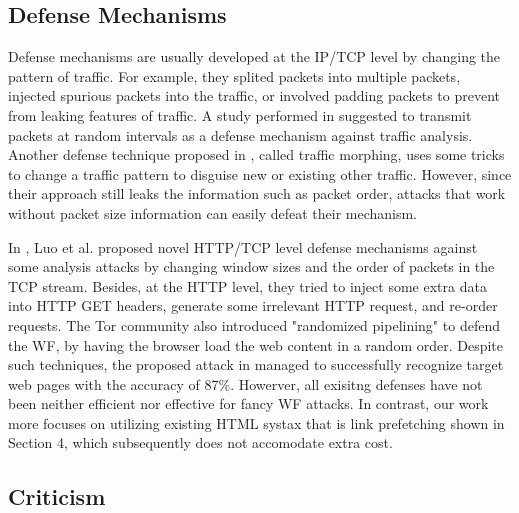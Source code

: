 

\subsection{Defense Mechanisms}

Defense mechanisms are usually developed at the IP/TCP level by changing the pattern of traffic.
For example, they splited packets into multiple packets, injected spurious packets into the traffic, or involved  padding packets to prevent from leaking features of traffic.
A study performed in \cite{fu2003} suggested to transmit packets at random intervals as a defense mechanism against traffic analysis.
Another defense technique proposed in \cite{wright2009}, called traffic morphing, uses some tricks to change a traffic pattern to disguise new or existing other traffic.
However, since their approach still leaks the information such as packet order, attacks that work without packet size information can easily defeat their mechanism.

In \cite{luo2011}, Luo et al. proposed novel HTTP/TCP level defense mechanisms against some analysis attacks by changing window sizes and the order of packets in the TCP stream.
Besides, at the HTTP level, they tried to inject some extra data into HTTP GET headers, generate some irrelevant HTTP request, and re-order requests.
The Tor community also introduced "randomized pipelining" \cite{perry11} to defend the WF, by having the browser load the web content in a random order.
Despite such techniques, the proposed attack in \cite{cai2012touching} managed to successfully recognize target web pages with the accuracy of 87\%. 
Howerver, all exisitng defenses have not been neither efficient nor effective for fancy WF attacks. %
In contrast, our work more focuses on utilizing existing HTML systax that is link prefetching shown in Section 4, which subsequently does not accomodate extra cost.

\subsection{Criticism}

